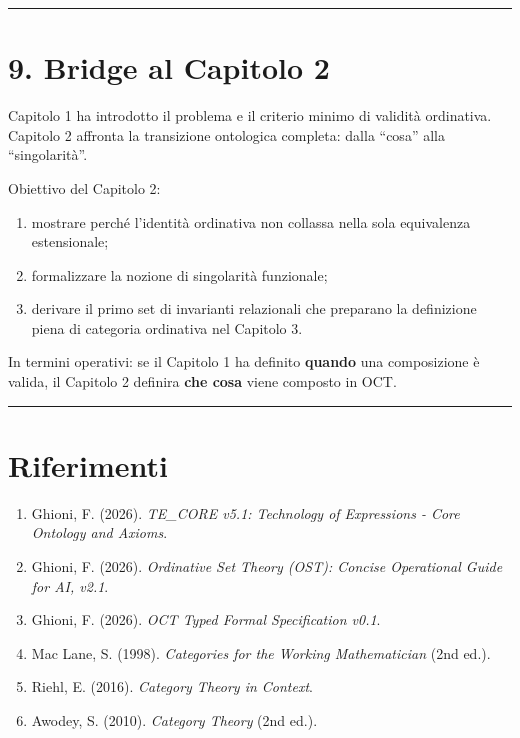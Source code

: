 \begin{center}\rule{0.5\linewidth}{0.5pt}\end{center}

\section{9. Bridge al Capitolo 2}

Capitolo 1 ha introdotto il problema e il criterio minimo di validità ordinativa.
Capitolo 2 affronta la transizione ontologica completa: dalla ``cosa'' alla ``singolarità''.

Obiettivo del Capitolo 2:

\begin{enumerate}
\def\labelenumi{\arabic{enumi}.}
\tightlist
\item
  mostrare perché l'identità ordinativa non collassa nella sola equivalenza estensionale;
\item
  formalizzare la nozione di singolarità funzionale;
\item
  derivare il primo set di invarianti relazionali che preparano la definizione piena di categoria ordinativa nel Capitolo 3.
\end{enumerate}

In termini operativi:
se il Capitolo 1 ha definito \textbf{quando} una composizione è valida,
il Capitolo 2 definira \textbf{che cosa} viene composto in OCT.

\begin{center}\rule{0.5\linewidth}{0.5pt}\end{center}

\section{Riferimenti}

\begin{enumerate}
\def\labelenumi{\arabic{enumi}.}
\tightlist
\item
  Ghioni, F. (2026). \emph{TE\_CORE v5.1: Technology of Expressions - Core Ontology and Axioms}.
\item
  Ghioni, F. (2026). \emph{Ordinative Set Theory (OST): Concise Operational Guide for AI, v2.1}.
\item
  Ghioni, F. (2026). \emph{OCT Typed Formal Specification v0.1}.
\item
  Mac Lane, S. (1998). \emph{Categories for the Working Mathematician} (2nd ed.).
\item
  Riehl, E. (2016). \emph{Category Theory in Context}.
\item
  Awodey, S. (2010). \emph{Category Theory} (2nd ed.).
\end{enumerate}
